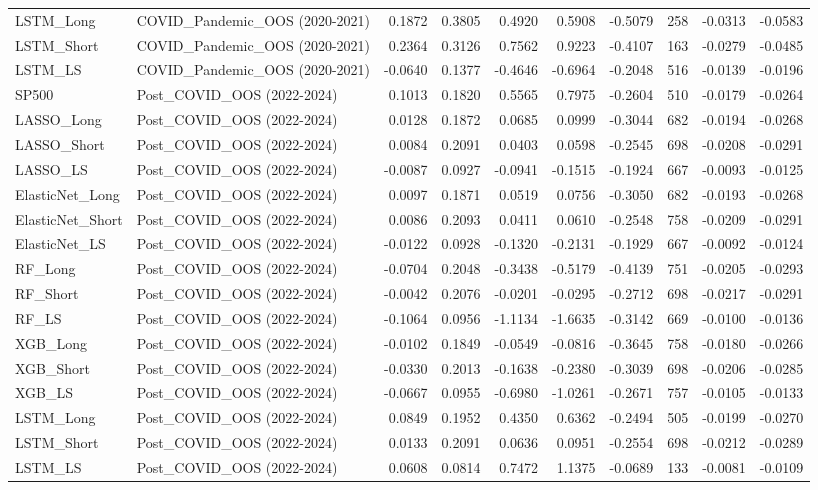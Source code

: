 \begin{tabular}{llrrrrrrrr}
\cline{1-10}
LSTM\_Long & COVID\_Pandemic\_OOS (2020-2021) & 0.1872 & 0.3805 & 0.4920 & 0.5908 & -0.5079 & 258 & -0.0313 & -0.0583 \\
\cline{1-10}
LSTM\_Short & COVID\_Pandemic\_OOS (2020-2021) & 0.2364 & 0.3126 & 0.7562 & 0.9223 & -0.4107 & 163 & -0.0279 & -0.0485 \\
\cline{1-10}
LSTM\_LS & COVID\_Pandemic\_OOS (2020-2021) & -0.0640 & 0.1377 & -0.4646 & -0.6964 & -0.2048 & 516 & -0.0139 & -0.0196 \\
\cline{1-10}
SP500 & Post\_COVID\_OOS (2022-2024) & 0.1013 & 0.1820 & 0.5565 & 0.7975 & -0.2604 & 510 & -0.0179 & -0.0264 \\
\cline{1-10}
LASSO\_Long & Post\_COVID\_OOS (2022-2024) & 0.0128 & 0.1872 & 0.0685 & 0.0999 & -0.3044 & 682 & -0.0194 & -0.0268 \\
\cline{1-10}
LASSO\_Short & Post\_COVID\_OOS (2022-2024) & 0.0084 & 0.2091 & 0.0403 & 0.0598 & -0.2545 & 698 & -0.0208 & -0.0291 \\
\cline{1-10}
LASSO\_LS & Post\_COVID\_OOS (2022-2024) & -0.0087 & 0.0927 & -0.0941 & -0.1515 & -0.1924 & 667 & -0.0093 & -0.0125 \\
\cline{1-10}
ElasticNet\_Long & Post\_COVID\_OOS (2022-2024) & 0.0097 & 0.1871 & 0.0519 & 0.0756 & -0.3050 & 682 & -0.0193 & -0.0268 \\
\cline{1-10}
ElasticNet\_Short & Post\_COVID\_OOS (2022-2024) & 0.0086 & 0.2093 & 0.0411 & 0.0610 & -0.2548 & 758 & -0.0209 & -0.0291 \\
\cline{1-10}
ElasticNet\_LS & Post\_COVID\_OOS (2022-2024) & -0.0122 & 0.0928 & -0.1320 & -0.2131 & -0.1929 & 667 & -0.0092 & -0.0124 \\
\cline{1-10}
RF\_Long & Post\_COVID\_OOS (2022-2024) & -0.0704 & 0.2048 & -0.3438 & -0.5179 & -0.4139 & 751 & -0.0205 & -0.0293 \\
\cline{1-10}
RF\_Short & Post\_COVID\_OOS (2022-2024) & -0.0042 & 0.2076 & -0.0201 & -0.0295 & -0.2712 & 698 & -0.0217 & -0.0291 \\
\cline{1-10}
RF\_LS & Post\_COVID\_OOS (2022-2024) & -0.1064 & 0.0956 & -1.1134 & -1.6635 & -0.3142 & 669 & -0.0100 & -0.0136 \\
\cline{1-10}
XGB\_Long & Post\_COVID\_OOS (2022-2024) & -0.0102 & 0.1849 & -0.0549 & -0.0816 & -0.3645 & 758 & -0.0180 & -0.0266 \\
\cline{1-10}
XGB\_Short & Post\_COVID\_OOS (2022-2024) & -0.0330 & 0.2013 & -0.1638 & -0.2380 & -0.3039 & 698 & -0.0206 & -0.0285 \\
\cline{1-10}
XGB\_LS & Post\_COVID\_OOS (2022-2024) & -0.0667 & 0.0955 & -0.6980 & -1.0261 & -0.2671 & 757 & -0.0105 & -0.0133 \\
\cline{1-10}
LSTM\_Long & Post\_COVID\_OOS (2022-2024) & 0.0849 & 0.1952 & 0.4350 & 0.6362 & -0.2494 & 505 & -0.0199 & -0.0270 \\
\cline{1-10}
LSTM\_Short & Post\_COVID\_OOS (2022-2024) & 0.0133 & 0.2091 & 0.0636 & 0.0951 & -0.2554 & 698 & -0.0212 & -0.0289 \\
\cline{1-10}
LSTM\_LS & Post\_COVID\_OOS (2022-2024) & 0.0608 & 0.0814 & 0.7472 & 1.1375 & -0.0689 & 133 & -0.0081 & -0.0109 \\
\cline{1-10}
\bottomrule
\end{tabular}

